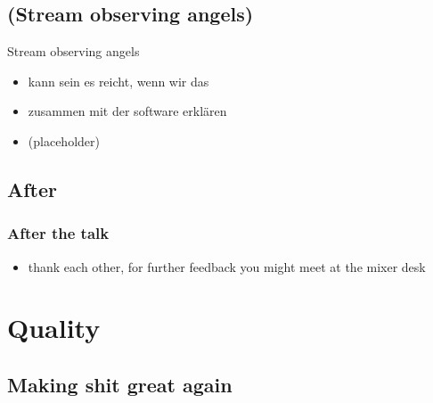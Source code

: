 \documentclass[hyperref={pdfpagelabels=false}]{beamer}
\begin{document}
\subsection{(Stream observing angels)} %
\begin{frame}{Stream observing angels}
\begin{itemize}
\item  kann sein es reicht, wenn wir das
\item  zusammen mit der software erklären
\item  (placeholder)
\end{itemize} 
\end{frame}

\subsection{After} %
\begin{frame}
\frametitle{After the talk}
\begin{itemize}
\item thank each other, for further feedback you might meet at the mixer desk
\end{itemize} 
\end{frame}

\section{Quality} 
\subsection{Making shit great again} 
\begin{frame}
\end{frame}
\end{document}
